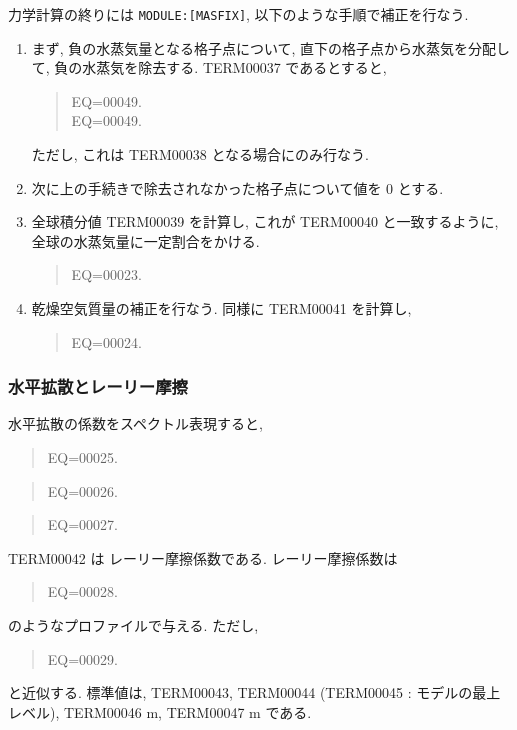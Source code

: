 力学計算の終りには \texttt{MODULE:[MASFIX]},
以下のような手順で補正を行なう.
\begin{enumerate}
\item まず, 負の水蒸気量となる格子点について,
      直下の格子点から水蒸気を分配して,
      負の水蒸気を除去する.
      TERM00037 であるとすると,
      \begin{quote}
EQ=00049.\\
EQ=00049.
\end{quote}
      ただし, これは TERM00038 となる場合にのみ行なう.

\item 次に上の手続きで除去されなかった格子点について値を 0 とする.

\item 全球積分値 TERM00039 を計算し,
      これが TERM00040 と一致するように,
      全球の水蒸気量に一定割合をかける.

      \begin{quote}
EQ=00023.
\end{quote}
      
\item 乾燥空気質量の補正を行なう.
      同様に TERM00041 を計算し,

      \begin{quote}
EQ=00024.
\end{quote}

\end{enumerate}

\subsubsection{水平拡散とレーリー摩擦}

水平拡散の係数をスペクトル表現すると,

\begin{quote}
EQ=00025.
\end{quote}
%
\begin{quote}
EQ=00026.
\end{quote}
%
\begin{quote}
EQ=00027.
\end{quote}

TERM00042 は レーリー摩擦係数である.
レーリー摩擦係数は
\begin{quote}
EQ=00028.
\end{quote}
のようなプロファイルで与える.
ただし,
\begin{quote}
EQ=00029.
\end{quote}
と近似する.
標準値は, TERM00043,
TERM00044 (TERM00045 : モデルの最上レベル),
TERM00046 m,
TERM00047 m である.


